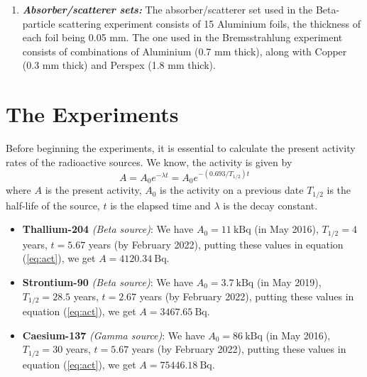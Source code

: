 \documentclass[%
 reprint,
nofootinbib,
 amsmath,amssymb,
 aps,
floatfix,
]{revtex4-2}
\begin{document}
\begin{enumerate}
        \item \textbf{\textit{Absorber/scatterer sets:}} The absorber/scatterer set used in the Beta-particle scattering experiment consists of 15 Aluminium foils, the thickness of each foil being 0.05 mm. The one used in the Bremsstrahlung experiment consists of combinations of Aluminium (0.7 mm thick), along with Copper (0.3 mm thick) and Perspex (1.8 mm thick).
    \end{enumerate}

    
    
\section{The Experiments}
    Before beginning the experiments, it is essential to calculate the present activity rates of the radioactive sources. We know, the activity is given by
    \begin{equation}
    \label{eq:act}
        A = A_0 e^{- \lambda t} = A_0 e^{-(0.693/T_{1/2})t}
    \end{equation}
    where $A$ is the present activity, $A_0$ is the activity on a previous date $T_{1/2}$ is the half-life of the source, $t$ is the elapsed time and $\lambda$ is the decay constant.
    \begin{itemize}
        \item \textbf{Thallium-204} \textit{(Beta source)}: We have $A_0 = \SI{11}{\kilo \becquerel}$ (in May 2016), $T_{1/2} = 4$ years, $t = 5.67$ years (by February 2022), putting these values in equation (\ref{eq:act}), we get $A = \SI{4120.34}{\becquerel}$.
        \item \textbf{Strontium-90} \textit{(Beta source)}: We have $A_0 = \SI{3.7}{\kilo \becquerel}$ (in May 2019), $T_{1/2} = 28.5$ years, $t = 2.67$ years (by February 2022), putting these values in equation (\ref{eq:act}), we get $A = \SI{3467.65}{\becquerel}$.
        \item \textbf{Caesium-137} \textit{(Gamma source)}: We have $A_0 = \SI{86}{\kilo \becquerel}$ (in May 2016), $T_{1/2} = 30$ years, $t = 5.67$ years (by February 2022), putting these values in equation (\ref{eq:act}), we get $A = \SI{75446.18}{\becquerel}$.
    \end{itemize}
    
\end{document}
